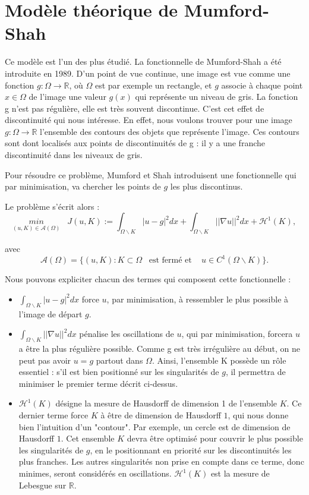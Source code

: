 \section{Modèle théorique de Mumford-Shah}

Ce modèle est l'un des plus étudié. La fonctionnelle de Mumford-Shah a été introduite en 1989. D'un point de vue continue, une image est vue comme une fonction $g : \Omega \rightarrow \mathbb{R}$, où $\Omega$ est par exemple un rectangle, et $g$ associe à chaque point $x \in \Omega$ de l'image une valeur $g(x)$ qui représente un niveau de gris. La fonction g n'est pas régulière, elle est très souvent discontinue. C'est cet effet de discontinuité qui nous intéresse. En effet, nous voulons trouver pour une image $g : \Omega \rightarrow \mathbb{R}$ l'ensemble des contours des objets que représente l'image. Ces contours sont dont localisés aux points de discontinuités de g : il y a une franche discontinuité dans les niveaux de gris.

\bigskip

Pour résoudre ce problème, Mumford et Shah introduisent une fonctionnelle qui par minimisation, va chercher les points de $g$ les plus discontinus.

\noindent
Le problème s'écrit alors : 
\[\underset{(u, K) \in \mathcal{A}(\Omega)}{min} \; \; \; J(u,K) := \int_{\Omega \backslash K} |u - g |^2 dx + \int_{\Omega \backslash K} ||\nabla u ||^2 dx + \mathcal{H}^1(K) ,  \]

avec 
\[ \mathcal{A} (\Omega) = \{ (u,K) : K \subset \Omega \; \; \; \text{est fermé et } \; \; \; u \in C^1(\Omega \backslash K) \} .\] 

\noindent
Nous pouvons expliciter chacun des termes qui composent cette fonctionnelle :
\begin{itemize}
\item $\int_{\Omega \backslash K} |u - g |^2 dx $ force $u$, par minimisation, à ressembler le plus possible à l'image de départ $g$.

\item $\int_{\Omega \backslash K} ||\nabla u ||^2 dx $ pénalise les oscillations de $u$, qui par minimisation, forcera $u$ a être la plus régulière possible. Comme g est très irrégulière au début, on ne peut pas avoir $u = g$ partout dans $\Omega$. 
Ainsi, l'ensemble K possède un rôle essentiel : s'il est bien positionné sur les singularités de $g$, il permettra de minimiser le premier terme décrit ci-dessus.

\item $\mathcal{H}^1(K) $ désigne la mesure de Hausdorff de dimension 1 de l'ensemble $K$. Ce dernier terme force $K$ à être de dimension de Hausdorff $1$, qui nous donne bien l'intuition d'un "contour". Par exemple, un cercle est de dimension de Hausdorff $1$. 
Cet ensemble $K$ devra être optimisé pour couvrir le plus possible les singularités de $g$, en le positionnant en priorité sur les discontinuités les plus franches. 
Les autres singularités non prise en compte dans ce terme, donc minimes, seront considérés en oscillations. $\mathcal{H}^1(K)$ est la mesure de Lebesgue sur $\mathbb{R}$.
\end{itemize}


